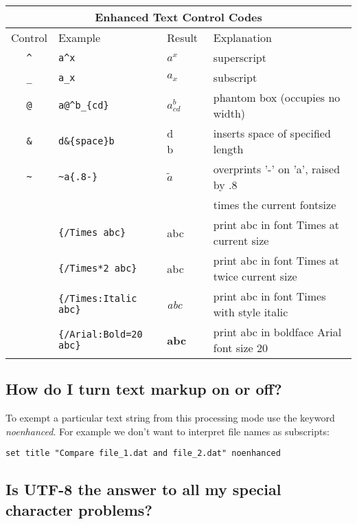 \documentclass[a4paper,11pt]{article}
\begin{document}
\begin{center}
\begin{tabular}{|clll|} \hline
\multicolumn{4}{|c|}{Enhanced Text Control Codes} \\ \hline
Control & Example & Result & Explanation \\ \hline
\verb~^~ & \verb~a^x~ & $a^x$ & superscript\\
\verb~_~ & \verb~a_x~ & $a_x$ & subscript\\
\verb~@~ & \verb~a@^b_{cd}~ & $a^b_{cd}$ &phantom box (occupies no width)\\
\verb~&~ & \verb~d&{space}b~ & d\verb*+     +b & inserts space of specified length\\
\verb|~| & \verb|~a{.8-}| & $\tilde{a}$ & overprints '-' on 'a', raised by .8\\
\verb~ ~ & \verb~ ~ & ~ ~ & times the current fontsize\\
\verb| | & \verb|{/Times abc}| & {\rm abc} & print abc in font Times at current size\\
\verb| | & \verb|{/Times*2 abc}| & \Large{\rm abc} & print abc in font Times at twice current size\\
\verb| | & \verb|{/Times:Italic abc}| & {\it abc} & print abc in font Times with style italic\\
\verb| | & \verb|{/Arial:Bold=20 abc}| & \Large\textsf{\textbf{abc}} & print abc in boldface Arial font size 20\\
\hline
\end{tabular}
\end{center}

\subsection{How do I turn text markup on or off?}

To exempt a particular text string from this processing mode use the keyword
{\em noenhanced}.  For example we don't want to interpret file names as subscripts:
\small
\begin{verbatim}
set title "Compare file_1.dat and file_2.dat" noenhanced
\end{verbatim}
\normalsize

\subsection{Is UTF-8 the answer to all my special character problems?}
\end{document}
